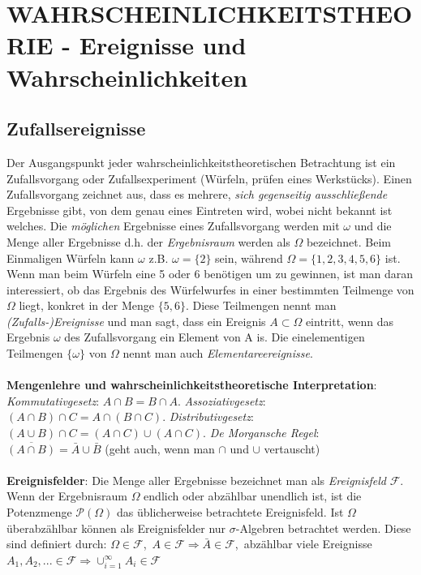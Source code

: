 \section{\textbf{WAHRSCHEINLICHKEITSTHEORIE} - Ereignisse und Wahrscheinlichkeiten}
\subsection{Zufallsereignisse}
Der Ausgangspunkt jeder wahrscheinlichkeitstheoretischen Betrachtung ist ein Zufallsvorgang oder Zufallsexperiment (Würfeln, prüfen eines Werkstücks). Einen Zufallsvorgang zeichnet aus, dass es mehrere, \emph{sich gegenseitig ausschließende} Ergebnisse gibt, von dem genau eines Eintreten wird, wobei nicht bekannt ist welches. Die \emph{möglichen} Ergebnisse eines Zufallsvorgang werden mit $\omega$ und die Menge aller Ergebnisse d.h. der \emph{Ergebnisraum} werden als $\Omega$ bezeichnet. Beim Einmaligen Würfeln kann $\omega$  z.B. $\omega = \{2\}$ sein, während $\Omega = \{1, 2, 3, 4, 5, 6\}$ ist. Wenn man beim Würfeln eine 5 oder 6 benötigen um zu gewinnen, ist man daran interessiert, ob das
Ergebnis des Würfelwurfes in einer bestimmten Teilmenge von $\Omega$ liegt, konkret in der Menge $\{5, 6\}$. Diese Teilmengen nennt man \emph{(Zufalls-)Ereignisse} und man sagt, dass ein Ereignis $A \subset \Omega$ eintritt, wenn das Ergebnis $\omega$ des Zufallsvorgang ein Element von A is. Die einelementigen Teilmengen $\{\omega\}$ von $\Omega$ nennt man auch \emph{Elementareereignisse}.\\\\
\textbf{Mengenlehre und wahrscheinlichkeitstheoretische Interpretation}: \emph{Kommutativgesetz}: $A \cap  B = B \cap A$. \emph{Assoziativgesetz}: $(A \cap B ) \cap C = A \cap (B \cap C)$. \emph{Distributivgesetz}: $(A \cup B) \cap C = (A \cap C) \cup (A \cap C)$. \emph{De Morgansche Regel}: $\overline{(A \cap B)} = \bar{A} \cup \bar{B}$ (geht auch, wenn man $\cap$ und $\cup$ vertauscht)\\\\
\textbf{Ereignisfelder}: Die Menge aller Ergebnisse bezeichnet man als \emph{Ereignisfeld} $\mathcal{F}$. Wenn der Ergebnisraum $\Omega$ endlich oder abzählbar unendlich ist, ist die Potenzmenge $\mathcal{P}(\Omega)$ das üblicherweise betrachtete Ereignisfeld. Ist $\Omega$ überabzählbar können als Ereignisfelder nur $\sigma$-Algebren betrachtet werden. Diese sind definiert durch: $\Omega \in \mathcal{F}$,\,\,\,$A \in \mathcal{F} \Rightarrow \bar{A} \in \mathcal{F}$,\,\,\,abzählbar viele Ereignisse $A_1, A_2, ... \in \mathcal{F} \Rightarrow \cup_{i=1}^\infty A_i \in \mathcal{F}$

